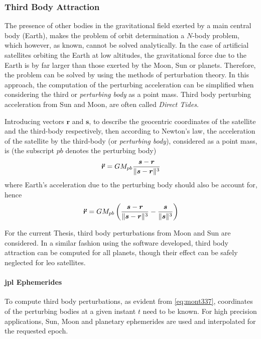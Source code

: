 \subsubsection{Third Body Attraction}\label{sssec:third-body-perturbations}

The presence of other bodies in the gravitational field exerted by a main central
body (Earth), makes the problem of orbit determination a $N$-body problem, which however, 
as known, cannot be solved analytically. In the case of artificial satellites orbiting 
the Earth at low altitudes, the gravitational force due to the Earth is by far larger 
than those exerted by the Moon, Sun or planets. Therefore, the problem can be solved 
by using the methods of perturbation theory. In this approach, the computation of the 
perturbing acceleration can be simplified when considering the third or \emph{perturbing body} 
as a point mass. Third body perturbing acceleration from Sun and Moon, are often 
called \emph{Direct Tides}.

Introducing vectors $\bm{r}$ and $\bm{s}$, to describe the geocentric coordinates 
of the satellite and the third-body respectively, then according to Newton's law, 
the acceleration of the satellite by the third-body (or \emph{perturbing body}), 
considered as a point mass, is (the subscript $pb$ denotes the perturbing body)
\begin{equation}
    \bm{\ddot{r}} = GM_{pb} \frac{\bm{s}-\bm{r}}
        {\lVert\bm{s}-\bm{r}\rVert^3}
\end{equation}
where Earth's acceleration due to the perturbing body should also be account for, 
hence
\begin{equation}\label{eq:mont337}
    \bm{\ddot{r}} = GM_{pb} \left( 
        \frac{\bm{s}-\bm{r}}{\lVert\bm{s}-\bm{r}\rVert^3} 
        - \frac{\bm{s}}{\lVert\bm{s}\rVert^3} \right)
\end{equation}

For the current Thesis, third body perturbations from Moon and Sun are considered. 
In a similar fashion using the software developed, third body attraction can be 
computed for all planets, though their effect can be safely neglected 
for \gls{leo} satellites.

\paragraph{\gls{jpl} Ephemerides}\label{par:jpl-ephemerides}

To compute third body perturbations, as evident from \autoref{eq:mont337}, 
coordinates of the perturbing bodies at a given instant $t$ need to be known. For high 
precision applications, Sun, Moon and planetary ephemerides are used and interpolated 
for the requested epoch.

